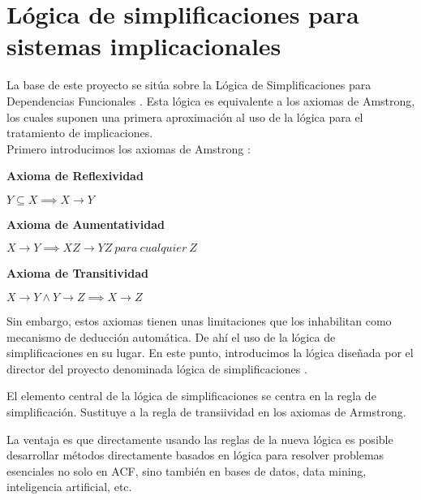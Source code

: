 \section{L\'ogica de simplificaciones para sistemas implicacionales}


La base de este proyecto se sit\'ua sobre la L\'ogica de Simplificaciones para Dependencias Funcionales \cite{Cordero2002}. Esta l\'ogica es equivalente a los axiomas de Amstrong, los cuales suponen una primera aproximaci\'on al uso de la l\'ogica para el tratamiento de implicaciones.\\

Primero introducimos los axiomas de Amstrong \cite{Armstrong1974DependencySO}:

\textbf{Axioma de Reflexividad}

\begin{center}
    \(Y \subseteq X \implies X \to Y \)
\end{center}

\textbf{Axioma de Aumentatividad}

\begin{center}
    \(X \to Y \implies XZ \to YZ \ para \ cualquier \ Z \)
\end{center}

\textbf{Axioma de Transitividad}

\begin{center}
    \(X \to Y \wedge Y \to Z \implies X \to Z \)
\end{center}

Sin embargo, estos axiomas tienen unas limitaciones que los inhabilitan como mecanismo de deducci\'on autom\'atica. De ah\'i el uso de la l\'ogica de simplificaciones en su lugar. En este punto, introducimos la l\'ogica dise\~nada por el director del proyecto denominada l\'ogica de simplificaciones \cite{Cordero2002}.

El elemento central de la l\'ogica de simplificaciones se centra en la regla de simplificaci\'on. Sustituye a la regla de transiividad en los axiomas de Armstrong.

La ventaja es que directamente usando las reglas de la nueva l\'ogica es posible desarrollar m\'etodos directamente basados en l\'ogica para resolver problemas esenciales no solo en ACF, sino tambi\'en en bases de datos, data mining, inteligencia artificial, etc. 


